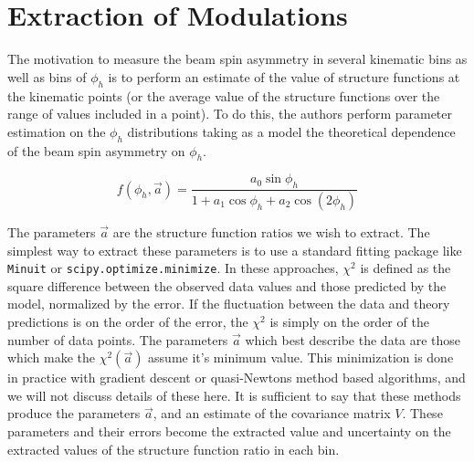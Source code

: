 
\section{Extraction of Modulations}
The motivation to measure the beam spin asymmetry in several kinematic bins as well as bins of $\phi_{h}$ is to perform an estimate of the value of structure functions at the kinematic points (or the average value of the structure functions over the range of values included in a point).  To do this, the authors perform parameter estimation on the $\phi_{h}$ distributions taking as a model the theoretical dependence of the beam spin asymmetry on $\phi_{h}$.

\begin{equation}
  f(\phi_h, \vec{a}) = \frac{a_0 \sin\phi_h}{1 + a_1 \cos\phi_h + a_2 \cos(2\phi_h)}
\end{equation}

The parameters $\vec{a}$ are the structure function ratios we wish to extract.  The simplest way to extract these parameters is to use a standard fitting package like \texttt{Minuit} or \texttt{scipy.optimize.minimize}.  In these approaches, $\chi^2$ is defined as the square difference between the observed data values and those predicted by the model, normalized by the error.  If the fluctuation between the data and theory predictions is on the order of the error, the $\chi^2$ is simply on the order of the number of data points.  The parameters $\vec{a}$ which best describe the data are those which make the $\chi^2 (\vec{a})$ assume it's minimum value.  This minimization is done in practice with gradient descent or quasi-Newtons method based algorithms, and we will not discuss details of these here.  It is sufficient to say that these methods produce the parameters $\vec{a}$, and an estimate of the covariance matrix $V$.  These parameters and their errors become the extracted value and uncertainty on the extracted values of the structure function ratio in each bin. \\

